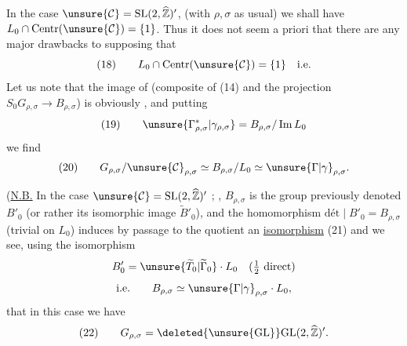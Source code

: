 In the case $\unsure{\mathcal{C}}=\mathrm{SL}(2,\widehat{\mathbb Z})'$, (with $\rho,\sigma$ as usual) we shall have $L_0\cap\mathrm{Centr}(\unsure{\mathcal{C}})=\{1\}$. Thus it does not seem a priori that there are any major drawbacks to supposing that
\[
(18)\qquad L_0\cap\mathrm{Centr}(\unsure{\mathcal{C}})=\{1\}\quad\text{i.e.}
\]
Let us note that  the image of
(composite of (14) and the projection $S_0G_{\rho,\sigma}\longrightarrow B_{\rho,\sigma}$) is obviously , and putting
\[
(19)\qquad\unsure{\Gamma_{\rho,\sigma}^{*}|\gamma_{\rho,\sigma}}=B_{\rho,\sigma}/\operatorname{Im}L_0
\]
we find
\[
(20)\qquad G_{\rho,\sigma}/\unsure{\mathcal{C}}_{\rho,\sigma}\simeq B_{\rho,\sigma}/L_0\simeq\unsure{\Gamma|\gamma}_{\rho,\sigma}.
\]

(\uline{N.B.} In the case $\unsure{\mathcal{C}}=\mathrm{SL}(2,\widehat{\mathbb Z})'$ ;  , $B_{\rho,\sigma}$  is the group previously denoted $B'_0$ (or rather its isomorphic image $\widetilde B'_0$), and the homomorphism $\mathrm{dét}\mid B'_0=B_{\rho,\sigma}$  (trivial on $L_0$) induces by passage to the quotient an \uline{isomorphism}
\hfill(21)
and we see,  using the isomorphism
\[
B'_0=\unsure{\widetilde T_0|\widetilde\Gamma_0}\cdot L_0\quad(\tfrac12\text{ direct})
\]
\[
\text{i.e.}\qquad B_{\rho,\sigma}\simeq\unsure{\Gamma|\gamma}_{\rho,\sigma}\cdot L_0,
\]
that in this case we have
\[
(22)\qquad G_{\rho,\sigma}=\deleted{\unsure{\mathrm{GL}}}\mathrm{GL}(2,\widehat{\mathbb Z})'.
\]
